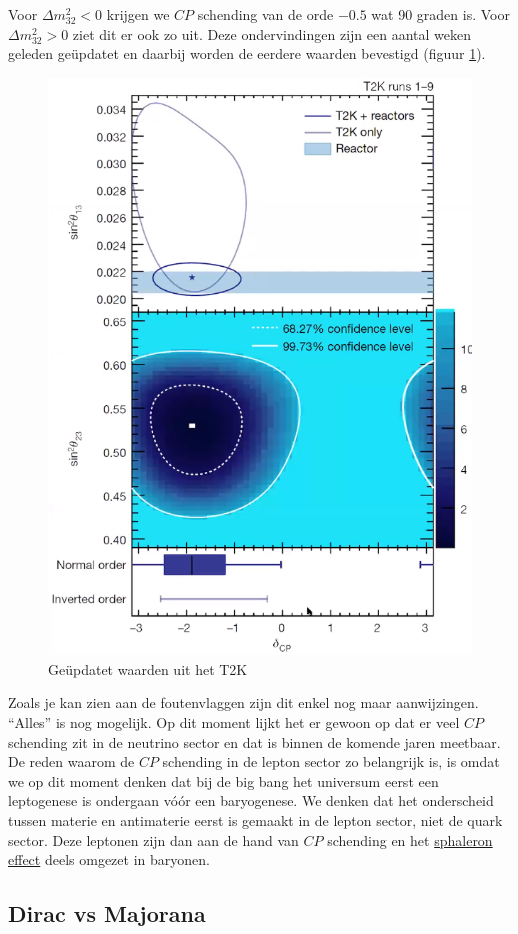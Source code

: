 \documentclass[../main.tex]{subfiles}
\begin{document}
Voor $\Delta m_{32}^{2}<0$ krijgen we $CP$ schending van de orde $-0.5$ wat 90 graden is. Voor $\Delta m_{32}^{2}>0$ ziet dit er ook zo uit. Deze ondervindingen zijn een aantal weken geleden geüpdatet en daarbij worden de eerdere waarden bevestigd (figuur \ref{fig:neutrinos/t2k_update}).

\begin{figure}[h]
    \centering
    \includegraphics[width=0.4\linewidth]{neutrinos/t2k_update.png}
    \caption{Geüpdatet waarden uit het T2K}%
    \label{fig:neutrinos/t2k_update}
\end{figure}

Zoals je kan zien aan de foutenvlaggen zijn dit enkel nog maar aanwijzingen. ``Alles'' is nog mogelijk. Op dit moment lijkt het er gewoon op dat er veel $CP$ schending zit in de neutrino sector en dat is binnen de komende jaren meetbaar.\\
De reden waarom de $CP$ schending in de lepton sector zo belangrijk is, is omdat we op dit moment denken dat bij de big bang het universum eerst een leptogenese is ondergaan vóór een baryogenese. We denken dat het onderscheid tussen materie en antimaterie eerst is gemaakt in de lepton sector, niet de quark sector. Deze leptonen zijn dan aan de hand van $CP$ schending en het \href{https://en.wikipedia.org/wiki/Sphaleron}{sphaleron effect} deels omgezet in baryonen.

\subsection{Dirac vs Majorana}%
\label{sub:dirac_vs_majorana}
\end{document}
